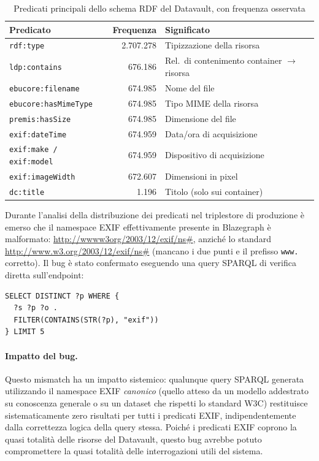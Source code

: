 \documentclass[12pt,a4paper,oneside]{book}
\newcommand{\code}[1]{\colorbox{light-gray}{\texttt{#1}}}
\begin{document}
\begin{table}[h]
  \centering
  \renewcommand{\arraystretch}{1.2}
  \begin{tabularx}{\textwidth}{@{} p{5cm} r >{\raggedright\arraybackslash}X @{}}
    \toprule
    Predicato & Frequenza & Significato \\
    \midrule
    \code{rdf:type}                      & 2.707.278 & Tipizzazione della risorsa \\
    \code{ldp:contains}                  & 676.186   & Rel.\ di contenimento container $\to$ risorsa \\
    \code{ebucore:filename}              & 674.985   & Nome del file \\
    \code{ebucore:hasMimeType}           & 674.985   & Tipo MIME della risorsa \\
    \code{premis:hasSize}                & 674.985   & Dimensione del file \\
    \code{exif:dateTime}                 & 674.959   & Data/ora di acquisizione \\
    \code{exif:make / exif:model}        & 674.959   & Dispositivo di acquisizione \\
    \code{exif:imageWidth}               & 672.607   & Dimensioni in pixel \\
    \code{dc:title}                      & 1.196     & Titolo (solo sui container) \\
    \bottomrule
  \end{tabularx}
  \caption{Predicati principali dello schema RDF del Datavault, con frequenza osservata}\label{tab:schema_predicati}
\end{table}

Durante l'analisi della distribuzione dei predicati nel triplestore di produzione è emerso che il namespace EXIF effettivamente presente in Blazegraph è malformato: \url{http://wwww3org/2003/12/exif/ns#}, anziché lo standard \url{http://www.w3.org/2003/12/exif/ns#} (mancano i due punti e il prefisso \code{www.} corretto). Il bug è stato confermato eseguendo una query SPARQL di verifica diretta sull'endpoint:

\begin{lstlisting}[language=sparql, caption=Query di verifica del namespace EXIF reale]
SELECT DISTINCT ?p WHERE {
  ?s ?p ?o .
  FILTER(CONTAINS(STR(?p), "exif"))
} LIMIT 5
\end{lstlisting}

\paragraph{Impatto del bug.} Questo mismatch ha un impatto sistemico: qualunque query SPARQL generata utilizzando il namespace EXIF \textit{canonico} (quello atteso da un modello addestrato su conoscenza generale o su un dataset che rispetti lo standard W3C) restituisce sistematicamente zero risultati per tutti i predicati EXIF, indipendentemente dalla correttezza logica della query stessa. Poiché i predicati EXIF coprono la quasi totalità delle risorse del Datavault, questo bug avrebbe potuto compromettere la quasi totalità delle interrogazioni utili del sistema.
\end{document}
